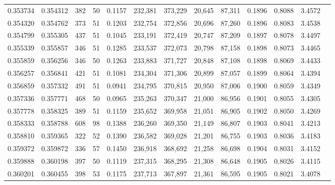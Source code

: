 \begin{tabular}{rrrrrrrrrrrrr}
0.353734 & 0.354312 &    382 &    50 &                                     0.1157 & 232,381 & 373,229 &  20,645 &  87,311 & 0.1896 & 0.8088 & 3.4572 \\
0.354320 & 0.354762 &    373 &    51 &                                     0.1203 & 232,754 & 372,856 &  20,696 &  87,260 & 0.1896 & 0.8083 & 3.4538 \\
0.354799 & 0.355305 &    437 &    51 &                                     0.1045 & 233,191 & 372,419 &  20,747 &  87,209 & 0.1897 & 0.8078 & 3.4497 \\
0.355339 & 0.355857 &    346 &    51 &                                     0.1285 & 233,537 & 372,073 &  20,798 &  87,158 & 0.1898 & 0.8073 & 3.4465 \\
0.355859 & 0.356256 &    346 &    50 &                                     0.1263 & 233,883 & 371,727 &  20,848 &  87,108 & 0.1898 & 0.8069 & 3.4433 \\
0.356257 & 0.356841 &    421 &    51 &                                     0.1081 & 234,304 & 371,306 &  20,899 &  87,057 & 0.1899 & 0.8064 & 3.4394 \\
0.356859 & 0.357332 &    491 &    51 &                                     0.0941 & 234,795 & 370,815 &  20,950 &  87,006 & 0.1900 & 0.8059 & 3.4349 \\
0.357336 & 0.357771 &    468 &    50 &                                     0.0965 & 235,263 & 370,347 &  21,000 &  86,956 & 0.1901 & 0.8055 & 3.4305 \\
0.357778 & 0.358325 &    389 &    51 &                                     0.1159 & 235,652 & 369,958 &  21,051 &  86,905 & 0.1902 & 0.8050 & 3.4269 \\
0.358333 & 0.358788 &    608 &    98 &                                     0.1388 & 236,260 & 369,350 &  21,149 &  86,807 & 0.1903 & 0.8041 & 3.4213 \\
0.358810 & 0.359365 &    322 &    52 &                                     0.1390 & 236,582 & 369,028 &  21,201 &  86,755 & 0.1903 & 0.8036 & 3.4183 \\
0.359372 & 0.359872 &    336 &    57 &                                     0.1450 & 236,918 & 368,692 &  21,258 &  86,698 & 0.1904 & 0.8031 & 3.4152 \\
0.359888 & 0.360198 &    397 &    50 &                                     0.1119 & 237,315 & 368,295 &  21,308 &  86,648 & 0.1905 & 0.8026 & 3.4115 \\
0.360201 & 0.360455 &    398 &    53 &                                     0.1175 & 237,713 & 367,897 &  21,361 &  86,595 & 0.1905 & 0.8021 & 3.4078 \\

\end{tabular}
